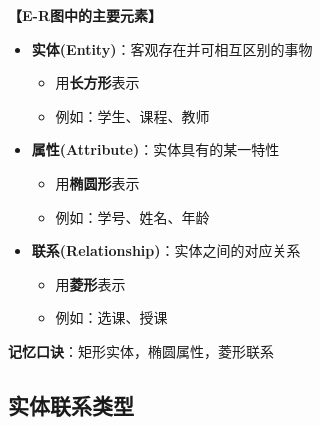 \documentclass[12pt, a4paper]{article}
\newenvironment{bluebox}[1]{%
  \begin{trivlist}
  \item[\hskip\labelsep \textbf{#1}]
  \setlength{\parskip}{0.5ex}
  \setlength{\itemsep}{0.5ex}
}{%
  \end{trivlist}
  }
\begin{document}
\begin{bluebox}{E-R图元素}
	\textbf{【E-R图中的主要元素】}

	\begin{itemize}[leftmargin=*, nosep]
		\item \textbf{实体(Entity)}：客观存在并可相互区别的事物
		      \begin{itemize}[nosep]
			      \item 用\textbf{长方形}表示
			      \item 例如：学生、课程、教师
		      \end{itemize}

		\item \textbf{属性(Attribute)}：实体具有的某一特性
		      \begin{itemize}[nosep]
			      \item 用\textbf{椭圆形}表示
			      \item 例如：学号、姓名、年龄
		      \end{itemize}

		\item \textbf{联系(Relationship)}：实体之间的对应关系
		      \begin{itemize}[nosep]
			      \item 用\textbf{菱形}表示
			      \item 例如：选课、授课
		      \end{itemize}
	\end{itemize}

	\textbf{记忆口诀}：矩形实体，椭圆属性，菱形联系
\end{bluebox}

\subsection{实体联系类型}
\end{document}
